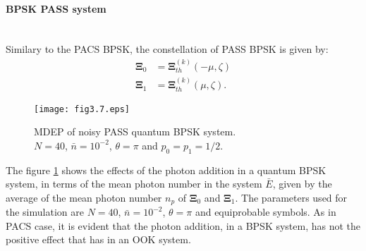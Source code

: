         \paragraph{BPSK PASS system}\mbox{}\\
        Similary to the PACS BPSK, the constellation of PASS BPSK is given by:
        \begin{equation}
            \begin{split}
                \pmb{\Xi}_0 &= \pmb{\Xi}_{th}^{(k)}(-\mu,\zeta)\\
                \pmb{\Xi}_1 &= \pmb{\Xi}_{th}^{(k)}(\mu,\zeta).
            \end{split}
        \end{equation}
        \begin{figure}[tbp]
            \begin{center}
                \texttt{[image: fig3.7.eps]}
                \caption{MDEP of noisy PASS quantum BPSK system.\\
                $N=40$, $\bar{n}=10^{-2}$, $\theta=\pi$ and $p_0=p_1=1/2$.}
                \label{fig:3.7}
            \end{center}
        \end{figure}
        The figure \ref{fig:3.7} shows the effects of the photon addition in a quantum BPSK
        system, in terms of the mean photon number in the system $\bar{E}$, given by the average of 
        the mean photon number $n_p$ of $\pmb{\Xi}_0$ and $\pmb{\Xi}_1$. The parameters used
        for the simulation are $N=40$, $\bar{n}=10^{-2}$, $\theta=\pi$ and equiprobable symbols.
        As in PACS case, it is evident that the photon addition, in a BPSK system, has not
        the positive effect that has in an OOK system.